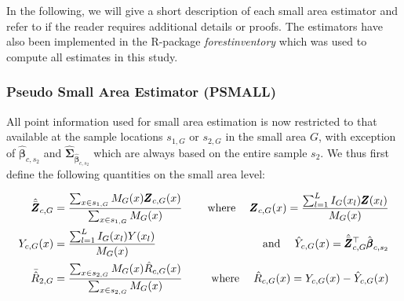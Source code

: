 \documentclass[remotesensing,article,submit,moreauthors,pdftex,10pt,a4paper]{mdpi}
\newcommand{\psmall}{PSMALL}
\begin{document}
In the following, we will give a short description of each small area estimator and refer to \citet{mandallaz2013a, mandallaz2016, mandallaz2013b} if the reader requires additional details or proofs. The estimators have also been implemented in the R-package \textit{forestinventory} \citep{forestinventory} which was used to compute all estimates in this study.\\



\subsubsection{Pseudo Small Area Estimator (\psmall{})}
\label{sec:psmall}

All point information used for small area estimation is now restricted to that available at the sample locations $s_{1,G}$ or $s_{2,G}$ in the small area $G$, with exception of $\hat{\pmb{\beta}}_{c,s_2}$ and $\hat{\pmb{\Sigma}}_{\hat{\pmb{\beta}}_{c,s_2}}$ which are always based on the entire sample $s_2$. We thus first define the following quantities on the small area level:

\begin{subequations}\label{eq:compsG}
	\begin{align}
	\hat{\bar{\pmb{Z}}}_{c,G} &= \frac{\sum_{x \in s_{1,G}} M_{G}(x) \pmb{Z}_{c,G}(x)}{\sum_{x \in s_{1,G}} M_{G}(x)} \label{eq:meanZcG} \hspace{3ex} &\text{where} \hspace{3ex}
	\pmb{Z}_{c,G}(x) =  \frac{\sum_{l=1}^{L} I_{G}(x_l)\pmb{Z}(x_l)}{M_{G}(x)}\\		
	Y_{c,G}(x) &= \frac{\sum_{l=1}^{L} I_{G}(x_l)Y(x_l)}{M_{G}(x)}  &\text{and} \hspace{3ex}
	\hat{Y}_{c,G}(x)=\hat{\bar{\pmb{Z}}}_{c,G}^{\top}\hat{\pmb{\beta}}_{c,s_2}\\
	\bar{\hat{R}}_{2,G} &= \frac{\sum_{x \in s_{2,G}} M_{G}(x) \hat{R}_{c,G}(x)}{\sum_{x \in s_{2,G}} M_{G}(x)} \hspace{3ex} &\text{where} \hspace{3ex}
	\hat{R}_{c,G}(x) = Y_{c,G}(x)-\hat{Y}_{c,G}(x)
	\end{align}
\end{subequations}
\end{document}
